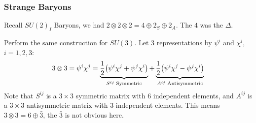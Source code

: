 \subsubsection{Strange Baryons}
Recall $SU(2)_I$ Baryons, we had $2\otimes2\otimes2=4\oplus 2_S\oplus 2_A$. The $4$ was the $\Delta$.

Perform the same construction for $SU(3)$. Let 3 representations by $\psi^i$ and $\chi^i$, $i=1,2,3$:
\begin{align*}
  3\otimes3=\psi^i\chi^j=
  \underbrace{\frac12\qty(\psi^i\chi^j+\psi^j\chi^i)}_{S^{ij}\text{ Symmetric}}
  +\underbrace{\frac12\qty(\psi^i\chi^j-\psi^j\chi^i)}_{A^{ij}\text{ Antisymmetric}}
\end{align*}
Note that $S^{ij}$ is a $3\times3$ symmetric matrix with 6 independent elements, and $A^{ij}$ is a $3\times3$ antisymmetric matrix with 3 independent elements. This means $3\otimes3=6\oplus\bar{3}$, the $\bar{3}$ is not obvious here.


